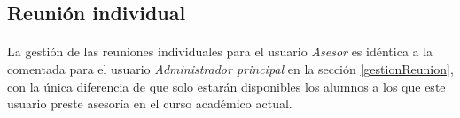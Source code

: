 \subsection{Reunión individual}

  \paragraph{}La gestión de las reuniones individuales para el usuario
  \textit{Asesor} es idéntica a la comentada para el usuario
  \textit{Administrador principal} en la sección \ref{gestionReunion},
  con la única diferencia de que solo estarán disponibles los alumnos a los que
  este usuario preste asesoría en el curso académico actual.